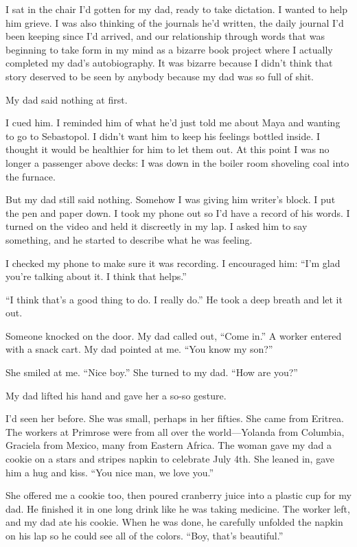\documentclass[12pt]{book}
\begin{document}
I sat in the chair I'd gotten for my dad, ready to take dictation. I wanted to help him grieve. I was also thinking of the journals he'd written, the daily journal I'd been keeping since I'd arrived, and our relationship through words that was beginning to take form in my mind as a bizarre book project where I actually completed my dad's autobiography. It was bizarre because I didn't think that story deserved to be seen by anybody because my dad was so full of shit.

My dad said nothing at first.

I cued him. I reminded him of what he'd just told me about Maya and wanting to go to Sebastopol. I didn't want him to keep his feelings bottled inside. I thought it would be healthier for him to let them out. At this point I was no longer a passenger above decks: I was down in the boiler room shoveling coal into the furnace.

But my dad still said nothing. Somehow I was giving him writer's block. I put the pen and paper down. I took my phone out so I'd have a record of his words. I turned on the video and held it discreetly in my lap. I asked him to say something, and he started to describe what he was feeling.

I checked my phone to make sure it was recording. I encouraged him: ``I'm glad you're talking about it. I think that helps.''

``I think that's a good thing to do. I really do.'' He took a deep breath and let it out.

Someone knocked on the door. My dad called out, ``Come in.'' A worker entered with a snack cart. My dad pointed at me. ``You know my son?''

She smiled at me. ``Nice boy.'' She turned to my dad. ``How are you?''

My dad lifted his hand and gave her a so-so gesture.

I'd seen her before. She was small, perhaps in her fifties. She came from Eritrea. The workers at Primrose were from all over the world---Yolanda from Columbia, Graciela from Mexico, many from Eastern Africa. The woman gave my dad a cookie on a stars and stripes napkin to celebrate July 4th. She leaned in, gave him a hug and kiss. ``You nice man, we love you.''

She offered me a cookie too, then poured cranberry juice into a plastic cup for my dad. He finished it in one long drink like he was taking medicine. The worker left, and my dad ate his cookie. When he was done, he carefully unfolded the napkin on his lap so he could see all of the colors. ``Boy, that's beautiful.''
\end{document}
